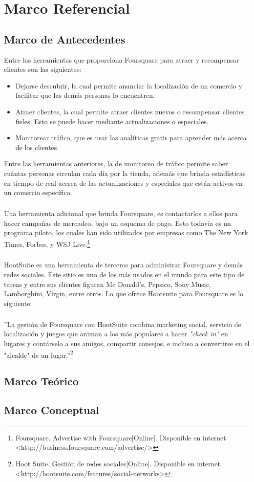 \chapter{Marco Referencial}
\label{sec:marco}

\section{Marco de Antecedentes}
Entre las herramientas que proporciona Foursquare para atraer y recompensar clientes son las siguientes:
\begin{itemize}
\item Dejarse descubrir, la cual permite anunciar la localizaci\'on de un comercio y facilitar que las dem\'as personas lo encuentren.
\item Atraer clientes, la cual permite atraer clientes nuevos o recompensar clientes fieles. Esto se puede hacer mediante actualizaciones o especiales.
\item Monitorear tr\'afico, que es usar las anal\'iticas gratis para aprender m\'as acerca de los clientes.
\end{itemize}
Entre las herramientas anteriores, la de monitoreo de tr\'afico permite saber cu\'antas personas circulan cada d\'ia por la tienda, adem\'as que brinda estad\'isticas en tiempo de real acerca de  las actualizaciones y especiales que est\'an activos en un comercio espec\'ifico.
\paragraph{}
Una herramienta adicional que brinda Foursquare, es contactarlos a ellos para hacer campa\~nas de mercadeo, bajo un esquema de pago. Esto todav\'ia es un programa piloto, los cuales han sido utilizados por empresas como The New York Times, Forbes, y WSJ Live.\footnote{Foursquare. Advertise with Foursquare[Online]. Disponible en internet \textless http://business.foursquare.com/advertise/\textgreater}
\paragraph{}
HootSuite es una herramienta de terceros para administrar Foursquare y dem\'as redes sociales. Este sitio es uno de los m\'as usados en el mundo para este tipo de tareas y entre sus clientes figuran Mc Donald’s, Pepsico, Sony Music, Lamborghini, Virgin, entre otros. Lo que ofrece Hootsuite para Foursquare es lo siguiente:
\paragraph{}
''La gesti\'on de Foursquare con HootSuite combina marketing social, servicio de localizaci\'on y juegos que animan a los m\'as populares a hacer \textit{"check in"} en lugares y cont\'arselo a sus amigos, compartir consejos, e incluso a convertirse en el "alcalde" de un lugar.''\footnote{Hoot Suite. Gesti\'on de redes sociales[Online]. Disponible en internet \textless http://hootsuite.com/features/social-networks\textgreater}

\section{Marco Te\'orico}

\section{Marco Conceptual}


\pagebreak